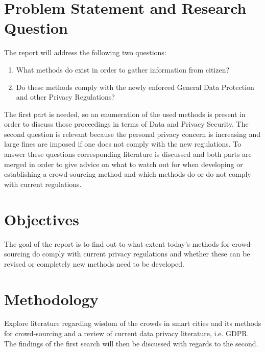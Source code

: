 \documentclass[a4paper,12pt]{article}
\begin{document}
	\section{Problem Statement and Research Question}
	\startsection
		The report will address the following two questions:
		\begin{enumerate}
			\item What methods do exist in order to gather information from citizen?
			\item Do these methods comply with the newly enforced General Data Protection and other Privacy Regulations?
		\end{enumerate}
		The first part is needed, so an enumeration of the used methods is present in order to discuss those proceedings in terms of Data and Privacy Security. The second question is relevant because the personal privacy concern is increasing and large fines are imposed if one does not comply with the new regulations. To answer these questions corresponding literature is discussed and both parts are merged in order to give advice on what to watch out for when developing or establishing a crowd-sourcing method and which methods do or do not comply with current regulations.
	\closesection
	
	\section{Objectives}
	\startsection
		The goal of the report is to find out to what extent today's methods for crowd-sourcing do comply with current privacy regulations and whether these can be revised or completely new methods need to be developed.
	\closesection
	
	\section{Methodology}
	\startsection
		Explore literature regarding wisdom of the crowds in smart cities and its methods for crowd-sourcing and a review of current data privacy literature, i.e. GDPR. The findings of the first search will then be discussed with regards to the second.
	\closesection
	
	\newpage
	
		
\end{document}
